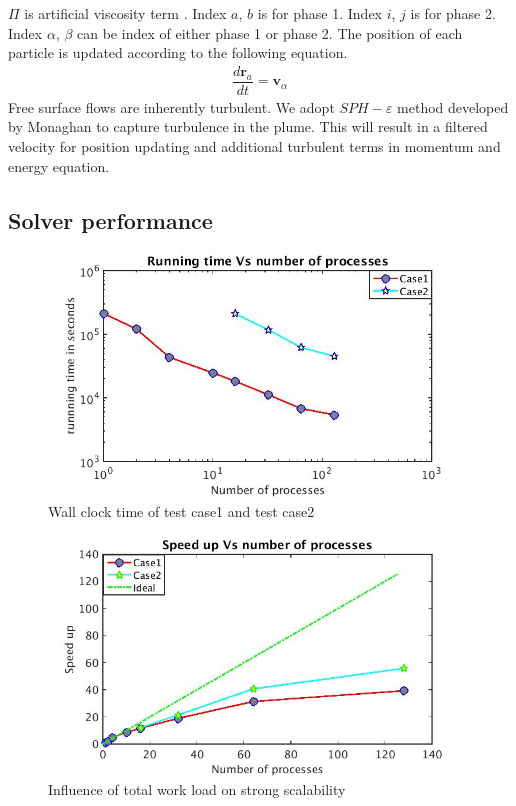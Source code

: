 \documentclass[conference,compsoc]{IEEEtran}
\begin{document}
$\Pi$ is artificial viscosity term \cite{monaghan1992smoothed}.
Index $a$, $b$ is for phase 1.
Index $i$, $j$ is for phase 2.
Index $\alpha$, $\beta$ can be index of either phase 1 or phase 2.
The position of each particle is updated according to the following equation.
\begin{align}
\dfrac{d \textbf{r}_a}{dt} = \textbf{v}_{\alpha} \label{eq:gov-update-pos}
\end{align}
Free surface flows are inherently turbulent. We adopt $SPH-\varepsilon$ method developed by Monaghan\cite{monaghan2011turbulence} to capture turbulence in the plume. This will result in a filtered velocity for position updating and additional turbulent terms in momentum and energy equation.
\subsection{Solver performance}
\begin{figure}[!t]
\centering
\includegraphics[scale=0.33]{2cases_time}
\caption{Wall clock time of test case1 and test case2}
\label{fig:2cases_time}
\end{figure}
%
\begin{figure}[!t]
\centering
\includegraphics[scale=0.33]{2cases_efficiency}
\caption{Influence of total work load on strong scalability}
\label{fig:2cases_efficiency}
\end{figure}
\end{document}
